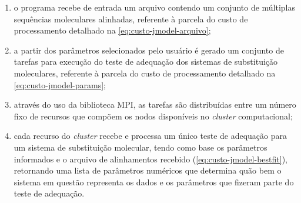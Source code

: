 \documentclass[english,brazilian]{UNISINOSmonografia} %
\begin{document}
\begin{enumerate}[label={\arabic*)}]
	
	\item o programa recebe de entrada um arquivo contendo um conjunto de múltiplas sequências moleculares alinhadas, referente à parcela do custo de processamento detalhado na \autoref{eq:custo-jmodel-arquivo};
	
	\item a partir dos parâmetros selecionados pelo usuário é gerado um conjunto de tarefas para execução do teste de adequação dos sistemas de substituição moleculares, referente à parcela do custo de processamento detalhado na \autoref{eq:custo-jmodel-params};
	
	\item através do uso da biblioteca MPI, as tarefas são distribuídas entre um número fixo de recursos que compõem os nodos disponíveis no \textit{cluster} computacional;
	
	\item cada recurso do \textit{cluster} recebe e processa um único teste de adequação para um sistema de substituição molecular, tendo como base os parâmetros informados e o arquivo de alinhamentos recebido (\autoref{eq:custo-jmodel-bestfit}), retornando uma lista de parâmetros numéricos que determina quão bem o sistema em questão representa os dados e os parâmetros que fizeram parte do teste de adequação.
	
\end{enumerate}
\end{document}
